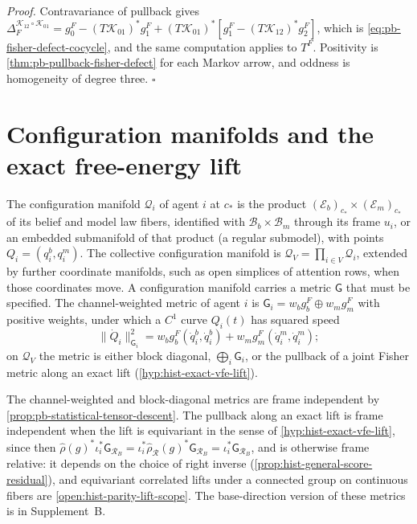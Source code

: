 \noindent\emph{Proof.}
Contravariance of pullback gives
$\Delta_F^{\mathscr K_{12}\circ\mathscr K_{01}}
=g_0^F-(T\mathscr K_{01})^*g_1^F+(T\mathscr K_{01})^*[g_1^F-(T\mathscr K_{12})^*g_2^F]$,
which is \eqref{eq:pb-fisher-defect-cocycle}, and the same computation applies to $T^F$.
Positivity is \cref{thm:pb-pullback-fisher-defect} for each Markov arrow, and oddness is
homogeneity of degree three.  $\square$

\section{Configuration manifolds and the exact free-energy lift}
\label{sec:hist-vfe-orbit-selection}

The configuration manifold $\mathcal Q_i$ of agent $i$ at $c_*$ is the product
$(\mathcal E_b)_{c_*}\times(\mathcal E_m)_{c_*}$ of its belief and model law fibers,
identified with $\mathcal B_b\times\mathcal B_m$ through its frame $u_i$, or an embedded
submanifold of that product (a regular submodel), with points $Q_i=(q_i^b,q_i^m)$.  The
collective configuration manifold is $\mathcal Q_V=\prod_{i\in V}\mathcal Q_i$, extended
by further coordinate manifolds, such as open simplices of attention rows, when those
coordinates move.  A configuration manifold carries a metric $\mathsf G$ that must be
specified.  The channel-weighted metric of agent $i$ is
$\mathsf G_i=w_bg^F_b\oplus w_mg^F_m$ with positive weights, under which a $C^1$ curve
$Q_i(t)$ has squared speed
\begin{equation}
\lVert\dot Q_i\rVert_{\mathsf G_i}^2
=w_bg^F_b(\dot q_i^b,\dot q_i^b)+w_mg^F_m(\dot q_i^m,\dot q_i^m);
\label{eq:hist-pointwise-clock-speed}
\end{equation}
on $\mathcal Q_V$ the metric is either block diagonal, $\bigoplus_i\mathsf G_i$, or the
pullback of a joint Fisher metric along an exact lift (\cref{hyp:hist-exact-vfe-lift}).

The channel-weighted and block-diagonal metrics are frame independent by
\cref{prop:pb-statistical-tensor-descent}. The pullback along an exact lift is frame
independent when the lift is equivariant in the sense of \cref{hyp:hist-exact-vfe-lift},
since then $\widehat\rho(g)^*\iota_i^*\mathsf G_{\mathscr R_B}
=\iota_i^*\widehat\rho_{\mathscr R}(g)^*\mathsf G_{\mathscr R_B}=\iota_i^*\mathsf G_{\mathscr R_B}$,
and is otherwise frame relative: it depends on the choice of right inverse
(\cref{prop:hist-general-score-residual}), and equivariant correlated lifts under a
connected group on continuous fibers are \cref{open:hist-parity-lift-scope}. The
base-direction version of these metrics is in Supplement~B.

